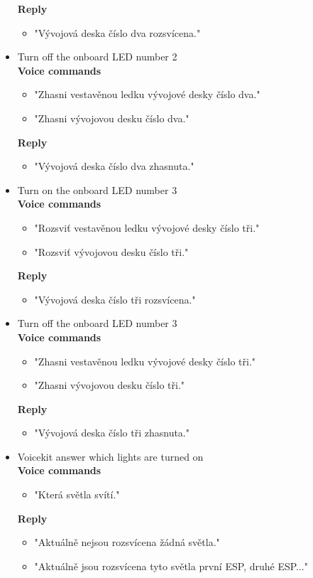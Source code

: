 \begin{itemize}
\begin{itemize}
    \end{itemize}
    \textbf{Reply}
    \begin{itemize}
        \item "Vývojová deska číslo dva rozsvícena."
    \end{itemize}
    \item Turn off the onboard LED number 2\\
    \textbf{Voice commands}
    \begin{itemize}
        \item "Zhasni vestavěnou ledku vývojové desky číslo dva."
        \item "Zhasni vývojovou desku číslo dva."
    \end{itemize}
    \textbf{Reply}
    \begin{itemize}
        \item "Vývojová deska číslo dva zhasnuta."
    \end{itemize}
    \item Turn on the onboard LED number 3\\
    \textbf{Voice commands}
    \begin{itemize}
        \item "Rozsviť vestavěnou ledku vývojové desky číslo tři."
        \item "Rozsviť vývojovou desku číslo tři."
    \end{itemize}
    \textbf{Reply}
    \begin{itemize}
        \item "Vývojová deska číslo tři rozsvícena."
    \end{itemize}
    \item Turn off the onboard LED number 3\\
    \textbf{Voice commands}
    \begin{itemize}
        \item "Zhasni vestavěnou ledku vývojové desky číslo tři."
        \item "Zhasni vývojovou desku číslo tři."
    \end{itemize}
    \textbf{Reply}
    \begin{itemize}
        \item "Vývojová deska číslo tři zhasnuta."
    \end{itemize}
    \item Voicekit answer which lights are turned on\\
    \textbf{Voice commands}
    \begin{itemize}
        \item "Která světla svítí."
    \end{itemize}
    \textbf{Reply}
    \begin{itemize}
        \item "Aktuálně nejsou rozsvícena žádná světla."
        \item "Aktuálně jsou rozsvícena tyto světla první ESP, druhé ESP..."
    \end{itemize}
\end{itemize}

